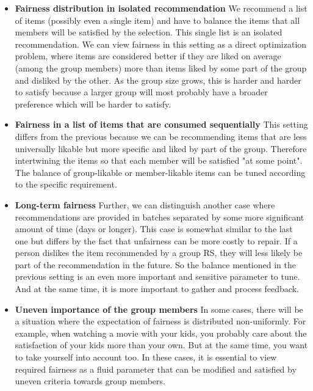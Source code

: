 \begin{itemize}
    \item \textbf{Fairness distribution in isolated recommendation}\newline
    We recommend a list of items (possibly even a single item) and have to balance the items that all members will be satisfied by the selection. This single list is an isolated recommendation. We can view fairness in this setting as a direct optimization problem, where items are considered better if they are liked on average (among the group members) more than items liked by some part of the group and disliked by the other. As the group size grows, this is harder and harder to satisfy because a larger group will most probably have a broader preference which will be harder to satisfy.
    
    \item \textbf{Fairness in a list of items that are consumed sequentially}
    This setting differs from the previous because we can be recommending items that are less universally likable but more specific and liked by part of the group. Therefore intertwining the items so that each member will be satisfied "at some point". The balance of group-likable or member-likable items can be tuned according to the specific requirement.
    
    \item \textbf{Long-term fairness}\newline
    Further, we can distinguish another case where recommendations are provided in batches separated by some more significant amount of time (days or longer). This case is somewhat similar to the last one but differs by the fact that unfairness can be more costly to repair. If a person dislikes the item recommended by a group RS, they will less likely be part of the recommendation in the future. So the balance mentioned in the previous setting is an even more important and sensitive parameter to tune. And at the same time, it is more important to gather and process feedback.
    
    \item \textbf{Uneven importance of the group members}
    In some cases, there will be a situation where the expectation of fairness is distributed non-uniformly. For example, when watching a movie with your kids, you probably care about the satisfaction of your kids more than your own. But at the same time, you want to take yourself into account too. In these cases, it is essential to view required fairness as a fluid parameter that can be modified and satisfied by uneven criteria towards group members.
    

\end{itemize}
